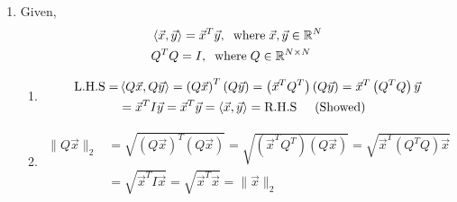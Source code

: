 \documentclass[11pt]{article} %
\begin{document}
\begin{enumerate}
\item Given,
\begin{equation*}
\begin{split}
&\left<\Vec x,\Vec y\right> = {\Vec x}^T\Vec y, \hspace{0.2cm}\text{where}\hspace{0.1cm} \Vec x,\Vec y \in \mathbb{R}^{N}\\
&Q^TQ = I, \hspace{0.2cm}\text{where}\hspace{0.1cm} Q \in \mathbb{R}^{N\times N}
\end{split}
\end{equation*}
\begin{enumerate}[\textbf{(\alph*)}]
\renewcommand{\labelenumi}{\bfseries\theenumi.}
\item
\begin{equation*}
\begin{split}
\text{L.H.S} = &\left<Q\Vec x, Q\Vec y\right> = {\left(Q\Vec x\right)}^T\left(Q\Vec y\right) = \left({\Vec x}^TQ^T\right)\left(Q\Vec y\right) = {\Vec x}^T\left(Q^TQ\right)\Vec y \\
&= {\Vec x}^TI\Vec y = {\Vec x}^T\Vec y = \left<\Vec x,\Vec y\right> = \text{R.H.S} \hspace{0.5cm} \text{(Showed)}
\end{split}
\end{equation*}
\item
\begin{equation*}
\begin{split}
\|Q\Vec x\|_2 &= \sqrt{{\left(Q\Vec x\right)}^T\left(Q\Vec x\right)} = \sqrt{\left({\Vec x}^TQ^T\right)\left(Q\Vec x\right)} = \sqrt{{\Vec x}^T\left(Q^TQ\right)\Vec x} \\
&= \sqrt{{\Vec x}^TI\Vec x} = \sqrt{{\Vec x}^T\Vec x} = \|\Vec x\|_2
\end{split}
\end{equation*}
\end{enumerate}


\end{enumerate}
\end{document}
